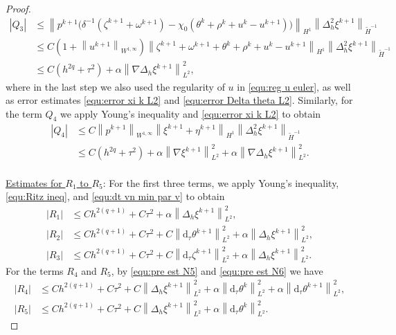 \documentclass[11pt, reqno]{amsart}
\theoremstyle{definition}
\numberwithin{equation}{section}
\newcommand{\dtt}{\mathrm{d}_\tau}
\newcommand{\norm}[2]{\left\|{#1}\right\|_{#2}}
\newcommand{\abs}[1]{\left|{#1}\right|}
\begin{document}
\begin{proof}
\begin{align*}
    \abs{Q_3}
    &\leq
    \norm{p^{k+1} \big(\delta^{-1}(\zeta^{k+1}+\omega^{k+1}) - \chi_0(\theta^k+\rho^k+u^k-u^{k+1})\big)}{H^1} 
    \norm{\Delta_h^2 \xi^{k+1}}{\widetilde{H}^{-1}}
    \\
    &\leq
    C\left(1+\norm{u^{k+1}}{W^{1,\infty}}\right) \norm{\zeta^{k+1}+\omega^{k+1}+\theta^k+\rho^k+ u^k-u^{k+1}}{H^1} \norm{\Delta_h^2 \xi^{k+1}}{\widetilde{H}^{-1}}
    \\
    &\leq
    C(h^{2q}+\tau^2) + \alpha \norm{\nabla\Delta_h \xi^{k+1}}{L^2}^2,
\end{align*}
where in the last step we also used the regularity of $u$ in \eqref{equ:reg u euler}, as well as error estimates \eqref{equ:error xi k L2} and \eqref{equ:error Delta theta L2}.
Similarly, for the term $Q_4$ we apply Young's inequality and \eqref{equ:error xi k L2} to obtain
\begin{align*}
    \abs{Q_4}
    &\leq
    C\norm{p^{k+1}}{W^{1,\infty}} \norm{\xi^{k+1}+\eta^{k+1}}{H^1} \norm{\Delta_h^2 \xi^{k+1}}{\widetilde{H}^{-1}}
    \\
    &\leq
    C(h^{2q}+\tau^2) + \alpha \norm{\nabla \xi^{k+1}}{L^2}^2 + \alpha \norm{\nabla\Delta_h \xi^{k+1}}{L^2}^2.
\end{align*}
\\
\underline{Estimates for $R_1$ to $R_5$}: For the first three terms, we apply Young's inequality, \eqref{equ:Ritz ineq}, and \eqref{equ:dt vn min par v} to obtain
\begin{align*}
    \abs{R_1}
    &\leq
    Ch^{2(q+1)}+ C\tau^2 + \alpha \norm{\Delta_h \xi^{k+1}}{L^2}^2,
    \\
    \abs{R_2}
    &\leq
    Ch^{2(q+1)}+ C\tau^2 + C\norm{\dtt \theta^{k+1}}{L^2}^2 + \alpha \norm{\Delta_h \xi^{k+1}}{L^2}^2,
    \\
    \abs{R_3}
    &\leq
    Ch^{2(q+1)}+ C\tau^2 + C\norm{\dtt \zeta^{k+1}}{L^2}^2 + \alpha \norm{\Delta_h \xi^{k+1}}{L^2}^2.
\end{align*}
For the terms $R_4$ and $R_5$, by \eqref{equ:pre est N5} and \eqref{equ:pre est N6} we have
\begin{align*}
    \abs{R_4}
    &\leq
    Ch^{2(q+1)} + C\tau^2 + C \norm{\Delta_h \xi^{k+1}}{L^2}^2 + \alpha \norm{\dtt \theta^k}{L^2}^2 + \alpha \norm{\dtt \theta^{k+1}}{L^2}^2,
    \\
    \abs{R_5}
    &\leq
    Ch^{2(q+1)}+ C\tau^2 + C\norm{\Delta_h \xi^{k+1}}{L^2}^2 + \alpha \norm{\dtt \theta^k}{L^2}^2.
\end{align*}

\end{proof}
\end{document}
